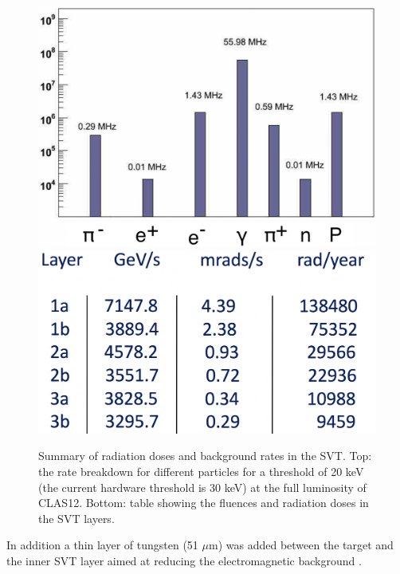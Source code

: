 \begin{figure}
	\centering
	\includegraphics[width=0.99\columnwidth,keepaspectratio]{img/bstRates.png}
	\includegraphics[width=0.99\columnwidth,keepaspectratio]{img/bstRadSummary.png}
	\caption{Summary of radiation doses and background rates in the SVT. Top: the rate breakdown for different particles
             for a threshold of 20 keV (the current hardware threshold is 30 keV) at the full luminosity of CLAS12.
             Bottom: table showing the fluences and radiation doses in the SVT layers. }
	\label{fig:radStudy}
\end{figure}

In addition a thin layer of tungsten (51 $\mu$m) was added between the target and the inner SVT layer aimed at reducing the electromagnetic
background \cite{bstDose}.





